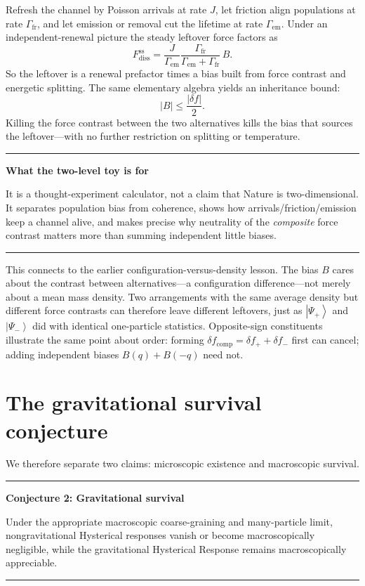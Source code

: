 \documentclass[11pt]{article}
\newcommand{\ket}[1]{\left|#1\right\rangle}
\newenvironment{plainbox}[1]{\begin{center}\begin{minipage}{0.91\textwidth}\hrule\vspace{0.55em}\textbf{#1}\par\smallskip}{\vspace{0.55em}\hrule\end{minipage}\end{center}}
\begin{document}
Refresh the channel by Poisson arrivals at rate $J$, let friction align populations at rate $\Gamma_{\mathrm{fr}}$, and let emission or removal cut the lifetime at rate $\Gamma_{\mathrm{em}}$.
Under an independent-renewal picture the steady leftover force factors as
\begin{equation}
F^{\mathrm{ss}}_{\mathrm{diss}}
=\frac{J}{\Gamma_{\mathrm{em}}}
\frac{\Gamma_{\mathrm{fr}}}{\Gamma_{\mathrm{em}}+\Gamma_{\mathrm{fr}}}\,B.
\end{equation}
So the leftover is a renewal prefactor times a bias built from force contrast and energetic splitting.
The same elementary algebra yields an inheritance bound:
\begin{equation}
\boxed{|B|\le\frac{|\delta f|}{2}.}
\end{equation}
Killing the force contrast between the two alternatives kills the bias that sources the leftover---with no further restriction on splitting or temperature.

\begin{plainbox}{What the two-level toy is for}
It is a thought-experiment calculator, not a claim that Nature is two-dimensional.
It separates population bias from coherence, shows how arrivals/friction/emission keep a channel alive, and makes precise why neutrality of the \emph{composite} force contrast matters more than summing independent little biases.
\end{plainbox}

This connects to the earlier configuration-versus-density lesson.
The bias $B$ cares about the contrast between alternatives---a configuration difference---not merely about a mean mass density.
Two arrangements with the same average density but different force contrasts can therefore leave different leftovers, just as $\ket{\Psi_+}$ and $\ket{\Psi_-}$ did with identical one-particle statistics.
Opposite-sign constituents illustrate the same point about order: forming $\delta f_{\mathrm{comp}}=\delta f_++\delta f_-$ first can cancel; adding independent biases $B(q)+B(-q)$ need not.

\section{The gravitational survival conjecture}
We therefore separate two claims: microscopic existence and macroscopic survival.

\begin{plainbox}{Conjecture 2: Gravitational survival}
Under the appropriate macroscopic coarse-graining and many-particle limit, nongravitational Hysterical responses vanish or become macroscopically negligible, while the gravitational Hysterical Response remains macroscopically appreciable.
\end{plainbox}
\end{document}
